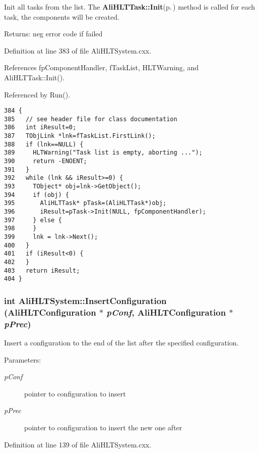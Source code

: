 Init all tasks from the list. The {\bf Ali\-HLTTask::Init}{\rm (p.\,\pageref{classAliHLTTask_a5})} method is called for each task, the components will be created. \begin{Desc}
\item[Returns:]neg error code if failed \end{Desc}


Definition at line 383 of file Ali\-HLTSystem.cxx.

References fp\-Component\-Handler, f\-Task\-List, HLTWarning, and Ali\-HLTTask::Init().

Referenced by Run().

\footnotesize\begin{verbatim}384 {
385   // see header file for class documentation
386   int iResult=0;
387   TObjLink *lnk=fTaskList.FirstLink();
388   if (lnk==NULL) {
389     HLTWarning("Task list is empty, aborting ...");
390     return -ENOENT;
391   }
392   while (lnk && iResult>=0) {
393     TObject* obj=lnk->GetObject();
394     if (obj) {
395       AliHLTTask* pTask=(AliHLTTask*)obj;
396       iResult=pTask->Init(NULL, fpComponentHandler);
397     } else {
398     }
399     lnk = lnk->Next();
400   }
401   if (iResult<0) {
402   }
403   return iResult;
404 }
\end{verbatim}\normalsize 


\subsubsection{\setlength{\rightskip}{0pt plus 5cm}int Ali\-HLTSystem::Insert\-Configuration ({\bf Ali\-HLTConfiguration} $\ast$ {\em p\-Conf}, {\bf Ali\-HLTConfiguration} $\ast$ {\em p\-Prec})}\label{classAliHLTSystem_a5}


Insert a configuration to the end of the list after the specified configuration. \begin{Desc}
\item[Parameters:]
\begin{description}
\item[{\em p\-Conf}]pointer to configuration to insert \item[{\em p\-Prec}]pointer to configuration to insert the new one after \end{description}
\end{Desc}


Definition at line 139 of file Ali\-HLTSystem.cxx.

